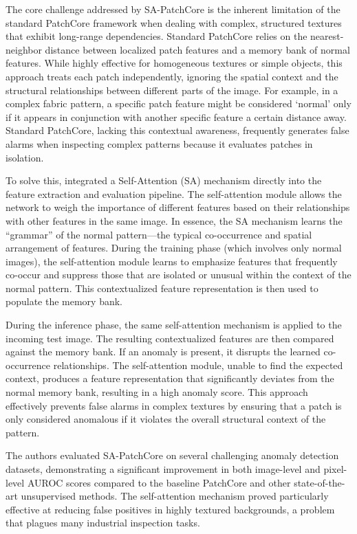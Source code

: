 \documentclass{ieeeaccess}
\begin{document}
The core challenge addressed by SA-PatchCore is the inherent limitation of the standard PatchCore framework when dealing with complex, structured textures that exhibit long-range dependencies. Standard PatchCore relies on the nearest-neighbor distance between localized patch features and a memory bank of normal features. While highly effective for homogeneous textures or simple objects, this approach treats each patch independently, ignoring the spatial context and the structural relationships between different parts of the image. For example, in a complex fabric pattern, a specific patch feature might be considered `normal' only if it appears in conjunction with another specific feature a certain distance away. Standard PatchCore, lacking this contextual awareness, frequently generates false alarms when inspecting complex patterns because it evaluates patches in isolation.

To solve this, \cite{b14} integrated a Self-Attention (SA) mechanism directly into the feature extraction and evaluation pipeline. The self-attention module allows the network to weigh the importance of different features based on their relationships with other features in the same image. In essence, the SA mechanism learns the ``grammar'' of the normal pattern---the typical co-occurrence and spatial arrangement of features. During the training phase (which involves only normal images), the self-attention module learns to emphasize features that frequently co-occur and suppress those that are isolated or unusual within the context of the normal pattern. This contextualized feature representation is then used to populate the memory bank.

During the inference phase, the same self-attention mechanism is applied to the incoming test image. The resulting contextualized features are then compared against the memory bank. If an anomaly is present, it disrupts the learned co-occurrence relationships. The self-attention module, unable to find the expected context, produces a feature representation that significantly deviates from the normal memory bank, resulting in a high anomaly score. This approach effectively prevents false alarms in complex textures by ensuring that a patch is only considered anomalous if it violates the overall structural context of the pattern.

The authors evaluated SA-PatchCore on several challenging anomaly detection datasets, demonstrating a significant improvement in both image-level and pixel-level AUROC scores compared to the baseline PatchCore and other state-of-the-art unsupervised methods. The self-attention mechanism proved particularly effective at reducing false positives in highly textured backgrounds, a problem that plagues many industrial inspection tasks.
\end{document}
